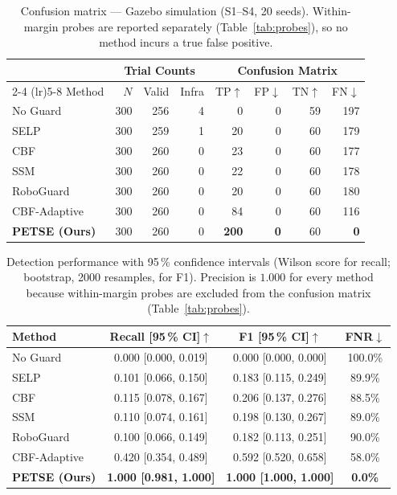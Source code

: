 \documentclass[journal,twoside,web]{ieeecolor}
\newcommand{\tblstyle}{\small\setlength{\tabcolsep}{4pt}}
\begin{document}
\begin{table}[t]
\centering
\tblstyle
\caption{Confusion matrix --- Gazebo simulation (S1--S4, 20 seeds). Within-margin probes are reported separately (Table~\ref{tab:probes}), so no method incurs a true false positive.}
\label{tab:confusion}
\footnotesize
\begin{tabular}{@{}l rrr rrrr@{}}
\toprule
& \multicolumn{3}{c}{Trial Counts} & \multicolumn{4}{c}{Confusion Matrix} \\
\cmidrule(lr){2-4} \cmidrule(lr){5-8}
Method & $N$ & Valid & Infra & TP$\uparrow$ & FP$\downarrow$ & TN$\uparrow$ & FN$\downarrow$ \\
\midrule
No Guard & 300 & 256 & 4 & 0 & 0 & 59 & 197 \\
SELP & 300 & 259 & 1 & 20 & 0 & 60 & 179 \\
CBF & 300 & 260 & 0 & 23 & 0 & 60 & 177 \\
SSM & 300 & 260 & 0 & 22 & 0 & 60 & 178 \\
RoboGuard & 300 & 260 & 0 & 20 & 0 & 60 & 180 \\
CBF-Adaptive & 300 & 260 & 0 & 84 & 0 & 60 & 116 \\
\rowcolor{lightgray} \textbf{PETSE (Ours)} & 300 & 260 & 0 & \textbf{200} & \textbf{0} & 60 & \textbf{0} \\
\bottomrule
\end{tabular}
\end{table}

\begin{table}[t]
\centering
\tblstyle
\caption{Detection performance with 95\,\% confidence intervals (Wilson score for recall; bootstrap, 2000 resamples, for F1). Precision is $1.000$ for every method because within-margin probes are excluded from the confusion matrix (Table~\ref{tab:probes}).}
\label{tab:detection}
\footnotesize
\begin{tabular}{@{}l c c c@{}}
\toprule
Method & Recall [95\,\% CI]$\uparrow$ & F1 [95\,\% CI]$\uparrow$ & FNR$\downarrow$ \\
\midrule
No Guard & 0.000 [0.000, 0.019] & 0.000 [0.000, 0.000] & 100.0\% \\
SELP & 0.101 [0.066, 0.150] & 0.183 [0.115, 0.249] & 89.9\% \\
CBF & 0.115 [0.078, 0.167] & 0.206 [0.137, 0.276] & 88.5\% \\
SSM & 0.110 [0.074, 0.161] & 0.198 [0.130, 0.267] & 89.0\% \\
RoboGuard & 0.100 [0.066, 0.149] & 0.182 [0.113, 0.251] & 90.0\% \\
CBF-Adaptive & 0.420 [0.354, 0.489] & 0.592 [0.520, 0.658] & 58.0\% \\
\rowcolor{lightgray} \textbf{PETSE (Ours)} & \textbf{1.000 [0.981, 1.000]} & \textbf{1.000 [1.000, 1.000]} & \textbf{0.0\%} \\
\bottomrule
\end{tabular}
\end{table}
\end{document}
